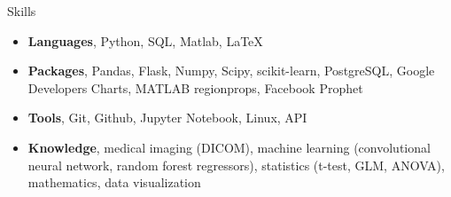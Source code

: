 \documentclass{resume} %
\begin{document}

\begin{rSection}{Skills}
	\begin{itemize}
		\item {\bf Languages}{, Python, SQL, Matlab, LaTeX}
		\item {\bf Packages}{, Pandas, Flask, Numpy, Scipy, scikit-learn, PostgreSQL, Google Developers Charts, MATLAB regionprops, Facebook Prophet}
		\item {\bf Tools}{, Git, Github, Jupyter Notebook, Linux, API}
		\item {\bf Knowledge}{, medical imaging (DICOM), machine learning (convolutional neural network, random forest regressors), statistics (t-test, GLM, ANOVA), mathematics, data visualization}
		
	\end{itemize}
\end{rSection}
\end{document}
